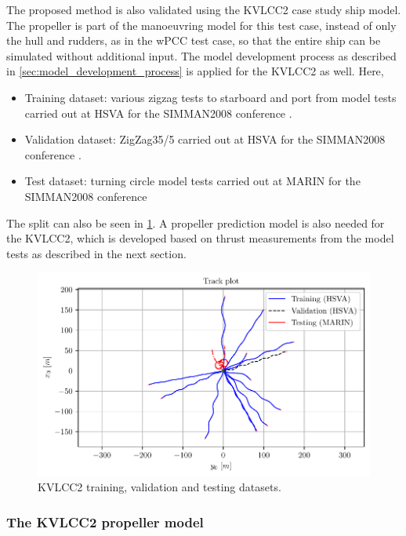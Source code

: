 The proposed method is also validated using the KVLCC2 case study ship model.
The propeller is part of the manoeuvring model for this test case, instead of only the hull and rudders, as in the wPCC test case, so that the entire ship can be simulated without additional input.
The model development process as described in \autoref{sec:model_development_process} is applied for the KVLCC2 as well.
Here,
\begin{itemize}
    \item Training dataset: various zigzag tests to starboard and port from model tests carried out at HSVA for the SIMMAN2008 conference \cite{stern_experience_2011}.
    \item Validation dataset: ZigZag35/5 carried out at HSVA for the SIMMAN2008 conference \cite{stern_experience_2011}.
    \item Test dataset: turning circle model tests carried out at MARIN for the SIMMAN2008 conference \cite{stern_experience_2011}
\end{itemize}
\noindent The split can also be seen in \ref{fig:kvlcc2_datasets}. A propeller prediction model is also needed for the KVLCC2, which is developed based on thrust measurements from the model tests as described in the next section.

\begin{figure}[!htb]
\centering
\includegraphics[width=\linewidth]{kappa/images/4.pdf}
\caption{KVLCC2 training, validation and testing datasets.}\label{fig:kvlcc2_datasets}\end{figure}

\newpage
\subsubsection{The KVLCC2 propeller model}
\label{\detokenize{06.20_results_kvlcc2:the-kvlcc2-propeller-model}}\label{\detokenize{06.20_results_kvlcc2:results-propeller-model}}

